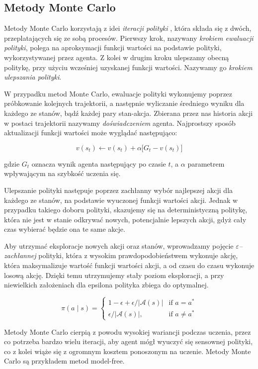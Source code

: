 \documentclass[licencjacka]{pracamgr}
\begin{document}
\subsection{Metody Monte Carlo}

Metody Monte Carlo korzystają z idei \emph{iteracji polityki} \cite{policy-iteration}, która składa się z dwóch, przeplatających się ze sobą procesów. Pierwszy krok, nazywany \emph{krokiem ewaluacji polityki}, polega na aproksymacji funkcji wartości na podstawie polityki, wykorzystywanej przez agenta. Z kolei w drugim kroku ulepszamy obecną politykę, przy użyciu wcześniej uzyskanej funkcji wartości. Nazywamy go \emph{krokiem ulepszania polityki}.

W przypadku metod Monte Carlo, ewaluacje polityki wykonujemy poprzez próbkowanie kolejnych trajektorii, a następnie wyliczanie średniego wyniku dla każdego ze stanów, bądź każdej pary stan-akcja. Zbierana przez nas historia akcji w postaci trajektorii nazywamy \emph{doświadczeniem} agenta. Najprostszy sposób aktualizacji funkcji wartości może wyglądać następująco:

$$ v(s_t) \leftarrow v(s_t) + \alpha \big[G_t - v(s_t)\big] $$

gdzie $G_t$ oznacza wynik agenta następujący po czasie $t$, a $\alpha$ parametrem wpływającym na szybkość uczenia się.

Ulepszanie polityki następuje poprzez zachłanny wybór najlepszej akcji dla każdego ze stanów, na podstawie wyuczonej funkcji wartości akcji. Jednak w przypadku takiego doboru polityki, skazujemy się na deterministyczną politykę, która nie jest w stanie odkrywać nowych, potencjalnie lepszych akcji, gdyż cały czas wybierać będzie ona te same akcje. 

Aby utrzymać eksploracje nowych akcji oraz stanów, wprowadzamy pojęcie \emph{$\varepsilon$--zachłannej} polityki, która z wysokim prawdopodobieństwem wykonuje akcję, która maksymalizuje wartość funkcji wartości akcji, a od czasu do czasu wykonuje losową akcję. Dzięki temu utrzymujemy stały poziom eksploracji, a przy niewielkich założeniach dla epsilona polityka zbiega do optymalnej.

$$
\pi(a \mid s) =
\begin{cases}
    1 - \epsilon + \epsilon/\lvert \mathcal{A}(s) \rvert & \text{if } a = a^\ast \\
    \epsilon/\lvert \mathcal{A}(s) \rvert,              & \text{if } a\neq a^\ast
\end{cases}
$$

Metody Monte Carlo cierpią z powodu wysokiej wariancji podczas uczenia, przez co potrzeba bardzo wielu iteracji, aby agent mógł wyuczyć się sensownej polityki, co z kolei wiąże się z ogromnym kosztem ponoszonym na uczenie. Metody Monte Carlo są przykładem metod model-free.
\end{document}
